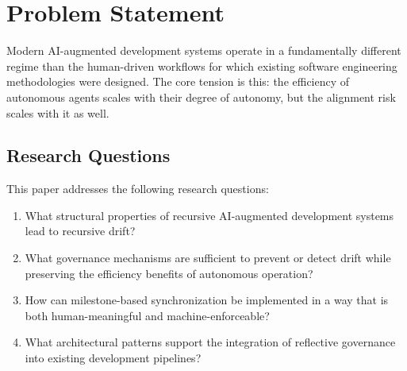 \section{Problem Statement}
\label{sec:problem-statement}

%

Modern AI-augmented development systems operate in a fundamentally different regime
than the human-driven workflows for which existing software engineering methodologies
were designed. The core tension is this: the efficiency of autonomous agents scales
with their degree of autonomy, but the alignment risk scales with it as well.

\subsection{Research Questions}

This paper addresses the following research questions:

\begin{enumerate}
  \item[RQ1] What structural properties of recursive AI-augmented development systems
    lead to recursive drift?
  \item[RQ2] What governance mechanisms are sufficient to prevent or detect drift while
    preserving the efficiency benefits of autonomous operation?
  \item[RQ3] How can milestone-based synchronization be implemented in a way that is
    both human-meaningful and machine-enforceable?
  \item[RQ4] What architectural patterns support the integration of reflective governance
    into existing development pipelines?
\end{enumerate}
